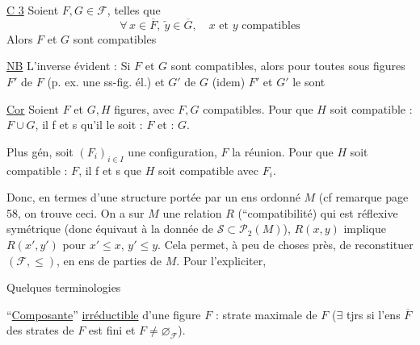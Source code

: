       

\uline{C 3} Soient $F,G\in\mathcal F$, telles que
\[
\forall\,x\in\overline F,\ \overleftarrow{y}\in\overline G,\quad x\text{ et }y\text{ compatibles}
\]
Alors $F$ et $G$ sont compatibles


\uline{NB} L'inverse évident : Si $F$ et $G$ sont compatibles, alors pour toutes sous figures $F'$ de $F$ (p. ex. une ss-fig. él.) et $G'$ de $G$ (idem) $F'$ et $G'$ le sont

\uline{Cor} Soient $F$ et $G,H$  figures,  avec $F,G$ compatibles. Pour que $H$ soit compatible : $F\cup G$, il f et s qu'il le soit : $F$ et : $G$. 

Plus gén, soit $(F_i)_{i\in I}$ une configuration, $F$ la   réunion. Pour que $H$ soit compatible : $F$, il f et s que $H$ soit compatible avec $F_i$.

Donc, en termes d'une structure portée par un ens ordonné $M$ (cf remarque page 58, on trouve ceci. On a sur  $M$ une relation $R$ (``compatibilité) qui est réflexive symétrique (donc équivaut à la donnée de $\mathcal S\subset\mathcal P_2(M)$),  $R(x,y)$ implique $R(x',y')$ pour $x'\leq x$, $y'\leq y$.  Cela permet, à peu de choses près, de reconstituer $(\mathcal F,\leq)$, en ens de parties de $M$. Pour l'expliciter,

Quelques terminologies

``\uline{Composante}'' \uline{irréductible}  d'une figure $F$ : strate maximale de $F$ ($\exists$ tjrs si l'ens $\overline F$ des strates de $F$ est fini  et $F\ne\varnothing_{\mathcal F}$).

